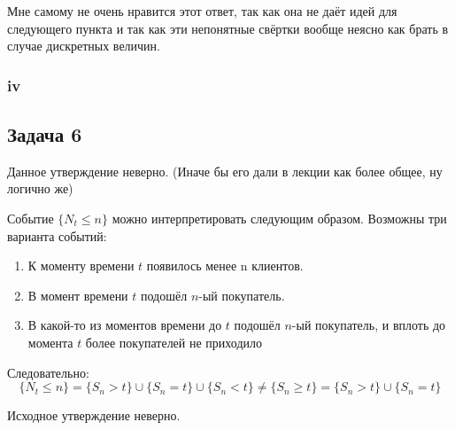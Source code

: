 \documentclass[a4paper,12pt]{article}
\begin{document}
Мне самому не очень нравится этот ответ, так как она не даёт идей для следующего пункта и так как эти непонятные свёртки вообще неясно как брать в случае дискретных величин. 


\subsubsection{iv}

\subsection{Задача 6}

Данное утверждение неверно. (Иначе бы его дали в лекции как более общее, ну логично же)

Событие $ \{N_t \le n\}$ можно интерпретировать следующим образом. Возможны три варианта событий:

\begin{enumerate}[\Sun]
	\item	К моменту времени $ t $ появилось менее n клиентов. 
	
	\item В момент времени $ t $ подошёл $ n $-ый покупатель.
	
	\item В какой-то из моментов времени до $ t $ подошёл $ n $-ый покупатель, и вплоть до момента $ t $ более покупателей не приходило
\end{enumerate}

Следовательно:
\[  \{N_t \le n\} = \{S_n > t\} \cup \{S_n = t\} \cup \{S_n < t\} \neq \{S_n \ge t \} =  \{S_n > t\} \cup \{S_n = t\}  \]

Исходное утверждение неверно.
\end{document}
